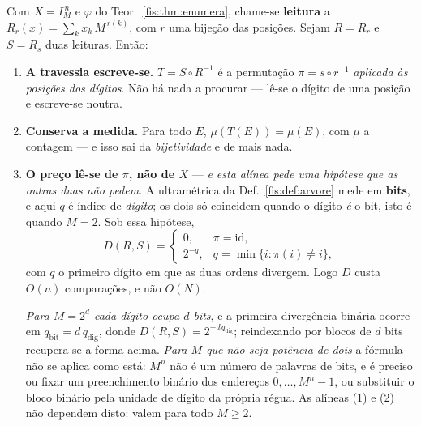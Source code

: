 \documentclass[livro.tex]{subfiles}
\begin{document}
\begin{proposicao}\label{fis:prop:travessia}
Com $X=I_M^{\,n}$ e $\varphi$ do Teor.~\ref{fis:thm:enumera}, chame-se
\textbf{leitura} a $R_r(x)=\sum_{k}x_k\,M^{\,r(k)}$, com $r$ uma bijeção das
posições. Sejam $R=R_r$ e $S=R_s$ duas leituras. Então:
\begin{enumerate}\itemsep2pt
\item[(1)] \textbf{A travessia escreve-se.} $T=S\circ R^{-1}$ é a permutação
$\pi=s\circ r^{-1}$ \emph{aplicada às posições dos dígitos}. Não há nada a
procurar --- lê-se o dígito de uma posição e escreve-se noutra.
\item[(2)] \textbf{Conserva a medida.} Para todo $E$, $\mu(T(E))=\mu(E)$, com
$\mu$ a contagem --- e isso sai da \emph{bijetividade} e de mais nada.
\item[(3)] \textbf{O preço lê-se de $\pi$, não de $X$} --- \emph{e esta alínea
pede uma hipótese que as outras duas não pedem}. A ultramétrica da
Def.~\ref{fis:def:arvore} mede em \textbf{bits}, e aqui $q$ é índice de
\emph{dígito}; os dois só coincidem quando o dígito \emph{é} o bit, isto é
quando $M=2$. Sob essa hipótese,
\[
\boxed{\;D(R,S)=\begin{cases}0,&\pi=\mathrm{id},\\[2pt]
2^{-q},&q=\min\{i:\pi(i)\neq i\},\end{cases}\;}
\]
com $q$ o primeiro dígito em que as duas ordens divergem. Logo $D$ custa $O(n)$
comparações, e não $O(N)$.

\emph{Para $M=2^{d}$ cada dígito ocupa $d$ bits}, e a primeira divergência
binária ocorre em $q_{\mathrm{bit}}=d\,q_{\mathrm{dig}}$, donde
$D(R,S)=2^{-d\,q_{\mathrm{dig}}}$; reindexando por blocos de $d$ bits recupera-se
a forma acima. \emph{Para $M$ que não seja potência de dois} a fórmula não se
aplica como está: $M^{n}$ não é um número de palavras de bits, e é preciso ou
fixar um preenchimento binário dos endereços $0,\dots,M^{n}-1$, ou substituir o
bloco binário pela unidade de dígito da própria régua. As alíneas (1) e (2) não
dependem disto: valem para todo $M\ge2$.
\end{enumerate}
\end{proposicao}
\end{document}
